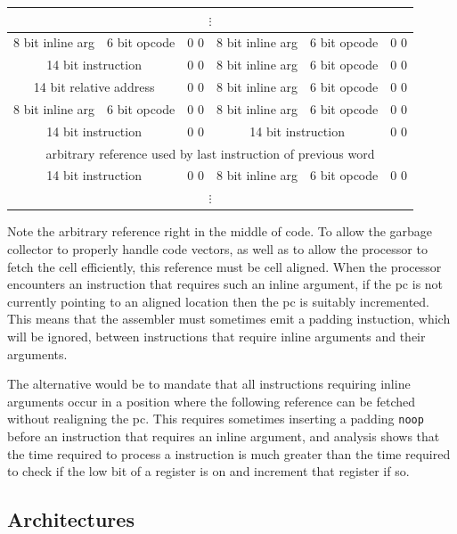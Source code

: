 \begin{center}
\begin{tabular}{|c|c|c|c|c|c|}
\multicolumn{6}{|c|}{$\vdots$}\\\hline
8 bit inline arg & 6 bit opcode & 0 0 &
8 bit inline arg & 6 bit opcode & 0 0 \\\hline
\multicolumn{2}{|c|}{14 bit instruction} & 0 0 &
8 bit inline arg & 6 bit opcode & 0 0 \\\hline
\multicolumn{2}{|c|}{14 bit relative address} & 0 0 &
8 bit inline arg & 6 bit opcode & 0 0 \\\hline
8 bit inline arg & 6 bit opcode & 0 0 &
8 bit inline arg & 6 bit opcode & 0 0 \\\hline
\multicolumn{2}{|c|}{14 bit instruction} & 0 0 &
\multicolumn{2}{c|}{14 bit instruction} & 0 0 \\\hline
\multicolumn{6}{|c|}{arbitrary reference used by last instruction of
 previous word} \\\hline
\multicolumn{2}{|c|}{14 bit instruction} & 0 0 &
8 bit inline arg & 6 bit opcode & 0 0 \\\hline
\multicolumn{6}{|c|}{$\vdots$}
\end{tabular}
\end{center}

Note the arbitrary reference right in the middle of code.  To allow
the garbage collector to properly handle code vectors, as well as to
allow the processor to fetch the cell efficiently, this reference must
be cell aligned.  When the processor encounters an instruction that
requires such an inline argument, if the pc is not currently pointing
to an aligned location then the pc is suitably incremented.  This
means that the assembler must sometimes emit a padding instuction,
which will be ignored, between instructions that require inline
arguments and their arguments.

The alternative would be to mandate that all instructions requiring inline arguments occur in a
position where the following reference can be fetched without
realigning the pc.  This requires sometimes inserting a padding
\texttt{noop} before an instruction that requires an inline argument,
and analysis shows that the time required to process a 
instruction is much greater than the time required to check if the low
bit of a register is on and increment that register if so.


\subsection{Architectures} \label{sec:architectures}

